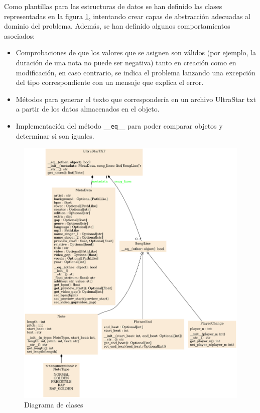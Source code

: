 Como plantillas para las estructuras de datos se han definido las clases representadas en la figura \ref{fig:class1}, intentando crear capas de abstracción adecuadas al dominio del problema. Además, se han definido algunos comportamientos asociados:
\begin{itemize}
	\item{Comprobaciones de que los valores que se asignen son válidos (por ejemplo, la duración de una nota no puede ser negativa) tanto en creación como en modificación, en caso contrario, se indica el problema lanzando una excepción del tipo correspondiente con un mensaje que explica el error.}
	\item{Métodos para generar el texto que correspondería en un archivo UltraStar txt a partir de los datos almacenados en el objeto.}
	\item{Implementación del método \texttt{\_\_eq\_\_} para poder comparar objetos  y determinar si son iguales.}
\end{itemize}

\begin{figure}[H]
	\includegraphics[width=\linewidth]{logos/classes.png}
	\caption{Diagrama de clases}
	\label{fig:class1}
\end{figure}

